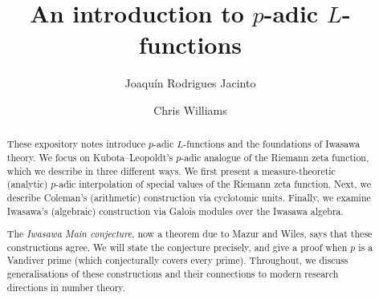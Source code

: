 \documentclass[a4paper,10pt, english, reqno]{smfart}
\author{Joaqu\'{i}n Rodrigues Jacinto}
\author{Chris Williams}
\title{An introduction to $p$-adic $L$-functions}
\date{}
\numberwithin{equation}{section}
\begin{document}
\thispagestyle{empty}
\maketitle

\renewcommand{\baselinestretch}{1.0}


\begin{abstract}
These expository notes introduce $p$-adic $L$-functions and the foundations of Iwasawa theory. We focus on Kubota--Leopoldt's $p$-adic analogue of the Riemann zeta function, which we describe in three different ways. We first present a measure-theoretic (analytic) $p$-adic interpolation of special values of the Riemann zeta function. Next, we describe Coleman's (arithmetic) construction via cyclotomic units. Finally, we examine Iwasawa's (algebraic) construction via Galois modules over the Iwasawa algebra.

The \emph{Iwasawa Main conjecture}, now a theorem due to Mazur and Wiles, says that these constructions agree. We will state the conjecture precisely, and give a proof when $p$ is a Vandiver prime (which conjecturally covers every prime). Throughout, we discuss generalisations of these constructions and their connections to modern research directions in number theory.
\end{abstract}

\end{document}
